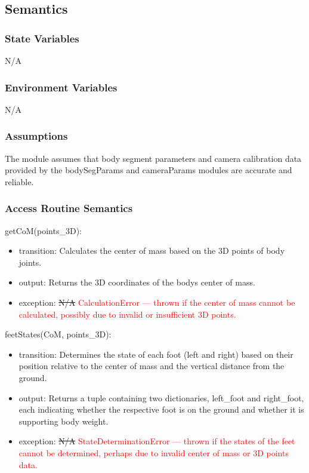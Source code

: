 \documentclass[12pt, titlepage]{article}
\newcommand{\rt}[1]{\textcolor{red}{#1}}
\begin{document}
\subsection{Semantics}

\subsubsection{State Variables}
N/A

\subsubsection{Environment Variables}
N/A

\subsubsection{Assumptions}
The module assumes that body segment parameters and camera calibration data
provided by the bodySegParams and cameraParams modules are accurate and
reliable.

\subsubsection{Access Routine Semantics}

\noindent getCoM(points\_3D):
\begin{itemize}
\item transition: Calculates the center of mass based on the 3D points of body
  joints.
\item output: Returns the 3D coordinates of the bodys center of mass.
\item exception: \sout{N/A} \rt{CalculationError --- thrown if the center of mass cannot be calculated, possibly due to invalid or insufficient 3D points.}
\end{itemize}

\noindent feetStates(CoM, points\_3D):
\begin{itemize}
\item transition: Determines the state of each foot (left and right) based on their
  position relative to the center of mass and the vertical distance from the
  ground.
\item output: Returns a tuple containing two dictionaries, left\_foot and
  right\_foot, each indicating whether the respective foot is on the ground and
  whether it is supporting body weight.
\item exception: \sout{N/A} \rt{StateDeterminationError --- thrown if the states of the feet cannot be determined, perhaps due to invalid center of mass or 3D points data.}
\end{itemize}
\end{document}
